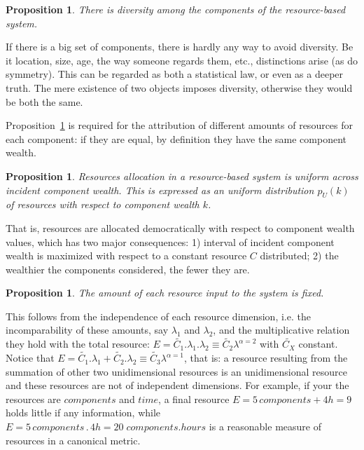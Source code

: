\documentclass[a4paper, 11pt]{article} %
\newtheorem{proposition}[theorem]{Proposition}
\begin{document}
\setcounter{theorem}{-1}
\begin{proposition}\label{prop:0}
	There is diversity among the components of the resource-based system.
\end{proposition}

If there is a big set of components, there is hardly any way to avoid diversity. Be it location, size, age, the way someone regards them, etc., distinctions arise (as do symmetry). This can be regarded as both a statistical law, or even as a deeper truth.
The mere existence of two objects imposes diversity,
otherwise they would be both the same.

Proposition~\ref{prop:0} is required for the attribution of different amounts of resources for each component:
if they are equal, by definition they have the same component wealth.

\begin{proposition}\label{prop:2}
	Resources allocation in a resource-based system is uniform across
	incident component wealth. 
	This is expressed as an uniform distribution $p_U(k)$ 
	of resources with respect to component wealth $k$.
\end{proposition}

That is, resources are allocated democratically with respect to component wealth values, which has two major consequences: 1) interval of incident component wealth is maximized with respect to a constant resource $C$ distributed; 
2) the wealthier the components considered, the fewer they are. 

\begin{proposition}\label{prop:1}
	The amount of each resource input to the system is fixed.
\end{proposition}

This follows from the independence of each resource dimension,
i.e. the incomparability of these amounts,
say $\lambda_1$ and $\lambda_2$,
and the multiplicative relation they hold with the total resource: $E=\widetilde{C_1} . \lambda_1 . \lambda_2 \equiv \widetilde{C_2}\lambda^{\alpha=2}$
with $\widetilde{C_X}$ constant.
Notice that $E=\widetilde{C_1} . \lambda_1 + \widetilde{C_2}.\lambda_2 \equiv \widetilde{C_3}\lambda^{\alpha=1}$, that is: a resource resulting from the summation of other two unidimensional resources is an unidimensional resource and these resources are not of independent dimensions.
For example, if your the resources are $components$ and $time$,
a final resource $E=5\, components + 4h=9$
holds little if any information, while
$E= 5\, components \, . \, 4 h= 20\; components . hours$ is
a reasonable measure of resources in a canonical metric.
\end{document}
